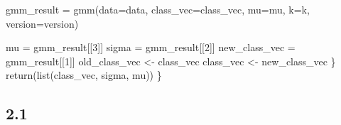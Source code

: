 \documentclass[
  11pt,
]{article}
\newenvironment{Shaded}{\begin{snugshade}}{\end{snugshade}}
\newcommand{\AttributeTok}[1]{\textcolor[rgb]{0.77,0.63,0.00}{#1}}
\newcommand{\DecValTok}[1]{\textcolor[rgb]{0.00,0.00,0.81}{#1}}
\newcommand{\FunctionTok}[1]{\textcolor[rgb]{0.00,0.00,0.00}{#1}}
\newcommand{\NormalTok}[1]{#1}
\newcommand{\OtherTok}[1]{\textcolor[rgb]{0.56,0.35,0.01}{#1}}
\begin{document}
\begin{Shaded}
\begin{Highlighting}[]
\NormalTok{    gmm\_result }\OtherTok{=} \FunctionTok{gmm}\NormalTok{(}\AttributeTok{data=}\NormalTok{data, }
                        \AttributeTok{class\_vec=}\NormalTok{class\_vec, }
                        \AttributeTok{mu=}\NormalTok{mu, }
                        \AttributeTok{k=}\NormalTok{k, }
                        \AttributeTok{version=}\NormalTok{version)}
    
\NormalTok{    mu }\OtherTok{=}\NormalTok{ gmm\_result[[}\DecValTok{3}\NormalTok{]]}
\NormalTok{    sigma }\OtherTok{=}\NormalTok{ gmm\_result[[}\DecValTok{2}\NormalTok{]]}
\NormalTok{    new\_class\_vec }\OtherTok{=}\NormalTok{ gmm\_result[[}\DecValTok{1}\NormalTok{]]}
\NormalTok{    old\_class\_vec }\OtherTok{\textless{}{-}}\NormalTok{ class\_vec}
\NormalTok{    class\_vec }\OtherTok{\textless{}{-}}\NormalTok{ new\_class\_vec}
\NormalTok{  \}}
  \FunctionTok{return}\NormalTok{(}\FunctionTok{list}\NormalTok{(class\_vec, sigma, mu))}
\NormalTok{\}}
\end{Highlighting}
\end{Shaded}

\hypertarget{section-6}{%
\subsection{2.1}\label{section-6}}
\end{document}
